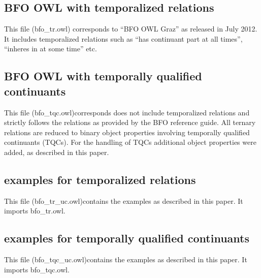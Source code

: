 \documentclass[10pt]{bmc_article}
\newenvironment{bmcformat}{\baselineskip20pt\sloppy\setboolean{publ}{false}}{\baselineskip20pt\sloppy}
\begin{document}
\begin{bmcformat}
  
\subsection*{BFO OWL with temporalized relations}
This file (bfo\_tr.owl) corresponds to ``BFO OWL Graz'' as released in July 2012. It includes temporalized 
relations such as ``has continuant part at all times'', ``inheres in at some time'' etc.

\subsection*{BFO OWL with temporally qualified continuants}
This file (bfo\_tqc.owl)corresponds does not include temporalized relations and strictly follows the relations
as provided by the BFO reference guide. All ternary relations are reduced to binary object properties involving temporally qualified continuants (TQCs).
For the handling of TQCs additional object properties were added, as described in this paper. 

\subsection*{examples for temporalized relations}
This file (bfo\_tr\_uc.owl)contains the examples as described in this paper. 
It imports bfo\_tr.owl.

\subsection*{examples for temporally qualified continuants}
This file (bfo\_tqc\_uc.owl)contains the examples as described in this paper. 
It imports bfo\_tqc.owl.


\end{bmcformat}
\end{document}
